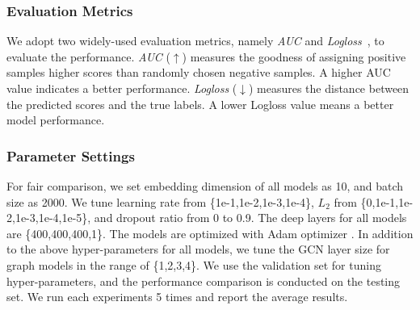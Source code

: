 \subsubsection{Evaluation Metrics}
We adopt two widely-used evaluation metrics, namely \textit{AUC} and \textit{Logloss}~\cite{guo2017deepfm}, to evaluate the performance.
\textit{AUC} ($\uparrow$)  measures the goodness of assigning positive samples higher scores than randomly chosen negative samples.
A higher AUC value indicates a better performance.
\textit{Logloss} ($\downarrow$) measures the distance between the predicted scores and the true labels.
A lower Logloss value means a better model performance.

\subsubsection{Parameter Settings}
For fair comparison, we set embedding dimension of all models as 10, and batch size as 2000. We tune learning rate from \{1e-1,1e-2,1e-3,1e-4\}, $L_{2}$ from \{0,1e-1,1e-2,1e-3,1e-4,1e-5\}, and dropout ratio from 0 to 0.9. The deep layers for all models are \{400,400,400,1\}. The models are optimized with Adam optimizer \cite{kingma2014adam}. 
In addition to the above hyper-parameters for all models, we tune the GCN layer size for graph models in the range of \{1,2,3,4\}.
We use the validation set for tuning hyper-parameters, and the performance comparison is conducted on the testing set.
We run each experiments 5 times and report the average results.

